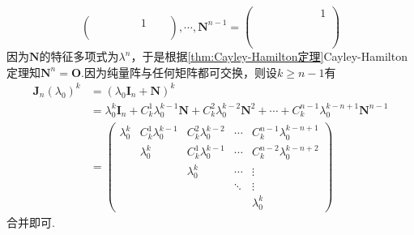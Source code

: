 {\begin{solution}
\[\begin{pmatrix}
                 &  &   &   &        & 1       \\
                 &  &   &   &        &   &     \\
                 &  &   &   &        &   &   &
            \end{pmatrix},\cdots,\bm{N}^{n-1}=\begin{pmatrix}
                 &  &  &  &  &  &  & 1 \\
                \\
                \\
                \\
                \\
                \\
            \end{pmatrix}
        \]因为$\bm{N}$的特征多项式为$\lambda^n$，于是根据\cref{thm:Cayley-Hamilton定理}Cayley-Hamilton定理知$\bm{N}^n=\bm{O}.$因为纯量阵与任何矩阵都可交换，则设$k\geqslant n-1$有\begin{align*}
            \bm{J}_n\left(\lambda_0\right)^k & =\left(\lambda_0\bm{I}_n+\bm{N}\right)^k                                                                                   \\
                                             & =\lambda_0^k\bm{I}_n+C_k^1\lambda_0^{k-1}\bm{N}+C_k^2\lambda_0^{k-2}\bm{N}^2+\cdots+C_k^{n-1}\lambda_0^{k-n+1}\bm{N}^{n-1} \\
                                             & =\begin{pmatrix}
                                                    \lambda_0^k & C_k^1\lambda_0^{k-1} & C_k^2\lambda_0^{k-2} & \cdots & C_k^{n-1}\lambda_0^{k-n+1} \\
                                                                & \lambda_0^k          & C_k^1\lambda_0^{k-1} & \cdots & C_k^{n-2}\lambda_0^{k-n+2} \\
                                                                &                      & \lambda_0^k          & \cdots & \vdots                     \\
                                                                &                      &                      & \ddots & \vdots                     \\
                                                                &                      &                      &        & \lambda_0^k
                                                \end{pmatrix}
        \end{align*}合并即可.
    \end{solution}
}
